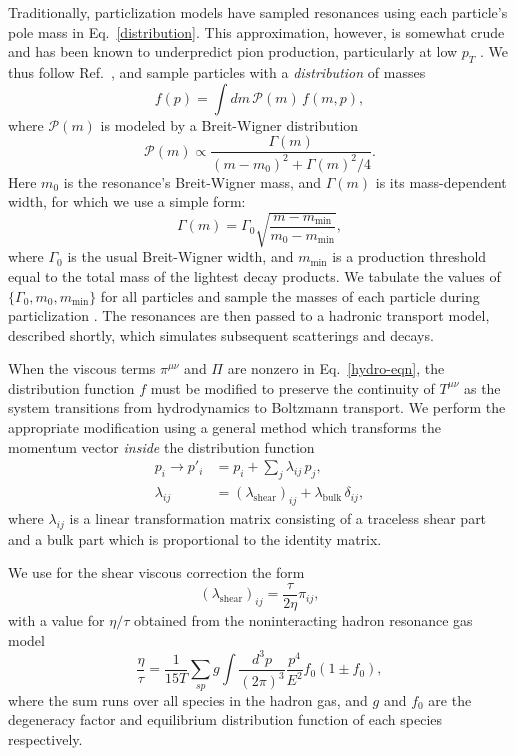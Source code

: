 \documentclass[aps,prc,reprint,amsmath,nofootinbib]{revtex4-1}
\begin{document}
Traditionally, particlization models have sampled resonances using each particle's pole mass in Eq.~\eqref{distribution}.
This approximation, however, is somewhat crude and has been known to underpredict pion production, particularly at low $p_T$ \cite{Sollfrank:1991xm, Huovinen:2016xxq, Vovchenko:2018fmh}.
We thus follow Ref.~\cite{Bernhard:2018hnz}, and sample particles with a \emph{distribution} of masses
\begin{equation}
  f(p) = \int dm\, \mathcal{P}(m)\, f(m, p),
\end{equation}
where $\mathcal{P}(m)$ is modeled by a Breit-Wigner distribution
\begin{equation}
  \mathcal{P}(m) \propto \frac{\Gamma(m)}{(m - m_0)^2 + \Gamma(m)^2/4}.
\end{equation}
Here $m_0$ is the resonance's Breit-Wigner mass, and $\Gamma(m)$ is its mass-dependent width, for which we use a simple form:
\begin{equation}
  \Gamma(m) = \Gamma_0 \sqrt{\frac{m - m_\mathrm{min}}{m_0 - m_\mathrm{min}}},
\end{equation}
where $\Gamma_0$ is the usual Breit-Wigner width, and $m_\mathrm{min}$ is a production threshold equal to the total mass of the lightest decay products.
We tabulate the values of $\{\Gamma_0, m_0, m_\mathrm{min}\}$ for all particles and sample the masses of each particle during particlization \cite{PDG:2017}.
The resonances are then passed to a hadronic transport model, described shortly, which simulates subsequent scatterings and decays.

When the viscous terms $\pi^{\mu\nu}$ and $\Pi$ are nonzero in Eq.~\eqref{hydro-eqn}, the distribution function $f$ must be modified to preserve the continuity of $T^{\mu\nu}$ as the system transitions from hydrodynamics to Boltzmann transport.
We perform the appropriate modification using a general method which transforms the momentum vector \emph{inside} the distribution function \cite{Pratt:2010jt}
\begin{align}
  \label{viscous_correction}
  p_i \rightarrow p'_i &= p_i + \sum\limits_j \lambda_{ij}\, p_j,\\
  \lambda_{ij} &= (\lambda_\mathrm{shear})_{ij} + \lambda_\mathrm{bulk}\, \delta_{ij},
\end{align}
where $\lambda_{ij}$ is a linear transformation matrix consisting of a traceless shear part and a bulk part which is proportional to the identity matrix.

We use for the shear viscous correction the form \cite{Pratt:2010jt}
\begin{equation}
  (\lambda_\mathrm{shear})_{ij} = \frac{\tau}{2 \eta} \pi_{ij},
\end{equation}
with a value for $\eta/\tau$ obtained from the noninteracting hadron resonance gas model
\begin{equation}
  \frac{\eta}{\tau} = \frac{1}{15 T} \sum\limits_{sp} g \int \frac{d^3p}{(2\pi)^3}\frac{p^4}{E^2} f_0 (1 \pm f_0),
\end{equation}
where the sum runs over all species in the hadron gas, and $g$ and $f_0$ are the degeneracy factor and equilibrium distribution function of each species respectively.
\end{document}
